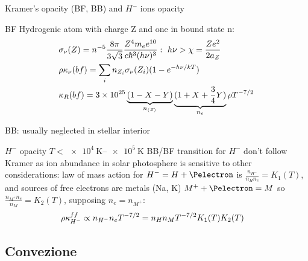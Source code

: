 \begin{frame}{Kramer's opacity (BF, BB) and $H^-$ ions opacity}
\begin{block}{BF}
Hydrogenic atom with charge Z and one \Pelectron in bound state n:
\begin{align*}
&\sigma_{\nu}(Z)=n\expy{-5}\frac{8\pi}{3\sqrt{3}}\frac{Z^4m_ee\expy{10}}{c\hbar^3(h\nu)^3}:\ h\nu>\chi=\frac{Ze^2}{2a_Z}\\
&\rho\kappa_{\nu}(bf)=\sum_in_{Z_i}\sigma_{\nu}(Z_i)(1-\exp{-h\nu/kT})\\
&\kappa_R(bf)=\num{3e25}\underbrace{(1-X-Y)}_{n_{\exv{Z}}}\underbrace{(1+X+\frac{3}{4}Y)}_{n_e}\rho T\expy{-7/2}
\end{align*}
\end{block}
\begin{block}{BB: usually neglected in stellar interior}
\end{block}
\begin{block}{$H^-$ opacity $T<\SIrange{e4}{e5}{\kelvin}$}
BB/BF transition for $H^-$ don't follow Kramer as ion abundance in solar photosphere is sensitive to other considerations: law of mass action for $H^-=H+\Pelectron$ is $\frac{n_{H^-}}{n_Hn_e}=K_1(T)$, and sources of free electrons are metals (Na, K) $M^++\Pelectron=M$ so $\frac{n_{M^+}n_e}{n_M}=K_2(T)$, supposing $n_e=n_{M^+}$:
\begin{align*}
&\rho\kappa_{H^-}^{ff}\propto n_{H^-}n_eT^{-7/2}=n_Hn_MT^{-7/2}K_1(T)K_2(T)
\end{align*}
\end{block}
\end{frame}

\subsection{Convezione}

